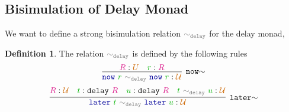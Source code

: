 \documentclass[twoside,11pt,openright]{report}
\theoremstyle{plain} %
\theoremstyle{definition}
\newtheorem{defn}{Definition}[section]
\theoremstyle{remark}
\newcommand*{\term}[1]{\textcolor{green!70!black}{#1}} %
\newcommand*{\type}[1]{\textcolor{magenta!90!black}{#1}}
\newcommand*{\universe}[1]{\textcolor{orange!80!black}{#1}}
\newcommand*{\relation}[1]{\textcolor{gray}{\ensuremath{\mathtt{#1}}}}
\newcommand*{\function}[1]{\textcolor{blue!60!black}{\ensuremath{\mathtt{#1}}}}
\newcommand*{\typeformer}[1]{\ensuremath{\mathtt{#1}}}
\begin{document}
\subsection{Bisimulation of Delay Monad}
We want to define a strong bisimulation relation \(\relation{\sim_{delay}}\) for the delay monad, 
\begin{defn}
  The relation \(\relation{\sim_{delay}}\) is defined by the following rules
  \begin{equation}
    \infer[\mathtt{now}\hspace{-1mm}\sim]{\function{now}~\term{r}~\relation{\sim_{delay}}~\function{now}~\term{r} : \universe{\mathcal{U}}}{\type{R} : \universe{U} & \term{r} : \type{R}}
  \end{equation}
  \begin{equation}
    \infer[\mathtt{later}\hspace{-1mm}\sim]{\function{later}~\term{t}~\relation{\sim_{delay}}~\function{later}~\term{u} : \universe{\mathcal{U}}}{\type{R} : \universe{\mathcal{U}} & \term{t} : \typeformer{delay}~\type{R} & \term{u} : \typeformer{delay}~\type{R} & \term{t}~\relation{\sim_{delay}}~\term{u} : \universe{\mathcal{U}}}
  \end{equation}
\end{defn}
\end{document}
